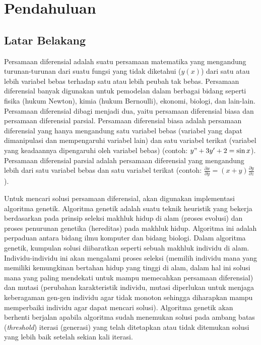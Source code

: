 \chapter{Pendahuluan}
\label{chap:intro}

\section{Latar Belakang}
\label{sec:label}

Persamaan diferensial adalah  suatu persamaan matematika yang mengandung turunan-turunan dari suatu fungsi yang tidak diketahui (\begin{math} y(x) \end{math}) dari satu atau lebih variabel bebas terhadap satu atau lebih peubah tak bebas. Persamaan diferensial banyak digunakan untuk pemodelan dalam berbagai bidang seperti fisika (hukum Newton), kimia (hukum Bernoulli), ekonomi, biologi, dan lain-lain. Persamaan diferensial dibagi menjadi dua, yaitu persamaan diferensial biasa dan persamaan diferensial parsial. Persamaan diferensial biasa adalah persamaan diferensial yang hanya mengandung satu variabel bebas (variabel yang dapat dimanipulasi dan mempengaruhi variabel lain) dan satu variabel terikat (variabel yang keadaannya dipengaruhi oleh variabel bebas) (contoh: \begin{math}y"+3y'+2 =\sin x\end{math}). Persamaan diferensial parsial adalah persamaan diferensial yang mengandung lebih dari satu variabel bebas dan satu variabel terikat (contoh: \begin{math} \frac{\partial x}{\partial y} = (x+y) \frac{\partial y}{\partial z}\end{math}).

Untuk mencari solusi persamaan diferensial, akan digunakan implementasi algoritma genetik. Algoritma genetik adalah suatu teknik heuristik yang bekerja berdasarkan pada prinsip seleksi makhluk hidup di alam (proses evolusi) dan proses penurunan genetika (hereditas) pada makhluk hidup. Algoritma ini adalah perpaduan antara bidang ilmu komputer dan bidang biologi. Dalam algoritma genetik, kumpulan solusi diibaratkan seperti sebuah makhluk individu di alam. Individu-individu ini akan mengalami proses seleksi (memilih individu mana yang memiliki kemungkinan bertahan hidup yang tinggi di alam, dalam hal ini solusi mana yang paling mendekati untuk mampu memecahkan persamaan diferensial) dan mutasi (perubahan karakteristik individu, mutasi diperlukan untuk menjaga keberagaman gen-gen individu agar tidak monoton sehingga diharapkan mampu memperbaiki individu agar dapat mencari solusi).
Algoritma genetik akan berhenti berjalan apabila algoritma sudah menemukan solusi pada ambang batas (\textit{threshold}) iterasi (generasi) yang telah ditetapkan atau tidak ditemukan solusi yang lebih baik setelah sekian kali iterasi.

